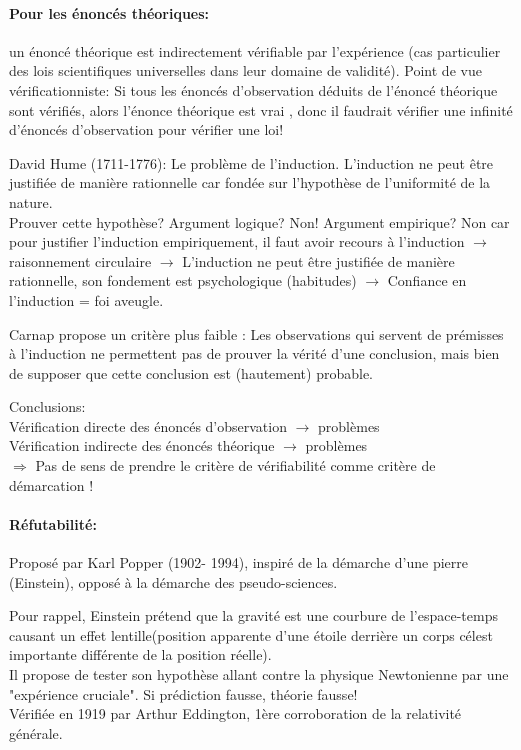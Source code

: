 \documentclass{report}
\begin{document}
	\paragraph{Pour les énoncés théoriques:} un énoncé théorique est indirectement vérifiable par l’expérience (cas particulier des lois scientifiques universelles dans leur domaine de validité). Point de vue vérificationniste: \og Si tous les énoncés d’observation déduits de l’énoncé théorique sont vérifiés, alors l’énonce théorique est vrai \fg, donc il faudrait vérifier une infinité d’énoncés d’observation pour vérifier une loi!
	
	David Hume (1711-1776): Le problème de l’induction. L’induction ne peut être justifiée de manière rationnelle car fondée sur l’hypothèse de l’uniformité de la nature.\\
	Prouver cette hypothèse? Argument logique? Non! Argument empirique? Non car pour justifier l’induction empiriquement, il faut avoir recours à l’induction $\rightarrow$ raisonnement circulaire $\rightarrow$ L’induction ne peut être justifiée de manière rationnelle, son fondement est psychologique (habitudes) $\rightarrow$ Confiance en l’induction = foi aveugle.
	
	Carnap propose un critère plus faible : Les observations qui servent de prémisses à l’induction ne permettent pas de prouver la vérité d’une conclusion, mais bien de supposer que cette conclusion est (hautement) probable.
	
	Conclusions:\\
	Vérification directe des énoncés d’observation $\rightarrow$ problèmes\\
	Vérification indirecte des énoncés théorique $\rightarrow$ problèmes\\
	 $\Rightarrow$ Pas de sens de prendre le critère de vérifiabilité comme critère de démarcation !
	
	\paragraph{Réfutabilité:} Proposé par Karl Popper (1902- 1994), inspiré de la démarche d'une pierre (Einstein), opposé à la démarche des pseudo-sciences.
	
	Pour rappel, Einstein prétend que la gravité est une courbure de l'espace-temps causant un effet lentille(position apparente d'une étoile derrière un corps célest importante différente de la position réelle).\\
	Il propose de tester son hypothèse allant contre la physique Newtonienne par une "expérience cruciale". Si prédiction fausse, théorie fausse!\\
	Vérifiée en 1919 par Arthur Eddington, 1ère corroboration de la relativité générale.
	
\end{document}
